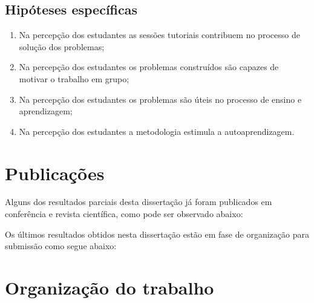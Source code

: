 \subsection{Hipóteses específicas}
\begin{enumerate}
\item{Na percepção dos estudantes as sessões tutoriais contribuem no processo de solução dos problemas;}
\item{Na percepção dos estudantes os problemas construídos são capazes de motivar o trabalho em grupo;}
\item{Na percepção dos estudantes os problemas são úteis no processo de ensino e aprendizagem;}
\item{Na percepção dos estudantes a metodologia estimula a autoaprendizagem.}
\end{enumerate}

\section{Publicações}
Alguns dos resultados parciais desta dissertação já
foram publicados em conferência e revista científica,
como pode ser observado abaixo:
\begin{itemize}

\end{itemize}
Os últimos resultados obtidos nesta dissertação estão
em fase de organização para submissão como segue abaixo:

\section{Organização do trabalho}
